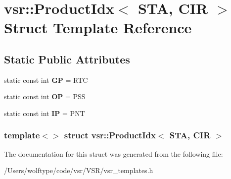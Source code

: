 \hypertarget{structvsr_1_1_product_idx_3_01_s_t_a_00_01_c_i_r_01_4}{\section{vsr\-:\-:Product\-Idx$<$ S\-T\-A, C\-I\-R $>$ Struct Template Reference}
\label{structvsr_1_1_product_idx_3_01_s_t_a_00_01_c_i_r_01_4}
}
\subsection*{Static Public Attributes}
\begin{DoxyCompactItemize}
\item 
\hypertarget{structvsr_1_1_product_idx_3_01_s_t_a_00_01_c_i_r_01_4_af9e39cc4b4360dd4be5a278cbf2e6987}{static const int {\bfseries G\-P} = R\-T\-C}\label{structvsr_1_1_product_idx_3_01_s_t_a_00_01_c_i_r_01_4_af9e39cc4b4360dd4be5a278cbf2e6987}

\item 
\hypertarget{structvsr_1_1_product_idx_3_01_s_t_a_00_01_c_i_r_01_4_ad2ddc709dca8c27cef5b4f06c0953cb5}{static const int {\bfseries O\-P} = P\-S\-S}\label{structvsr_1_1_product_idx_3_01_s_t_a_00_01_c_i_r_01_4_ad2ddc709dca8c27cef5b4f06c0953cb5}

\item 
\hypertarget{structvsr_1_1_product_idx_3_01_s_t_a_00_01_c_i_r_01_4_a27d83aacdeeebdde200489fcc71304d6}{static const int {\bfseries I\-P} = P\-N\-T}\label{structvsr_1_1_product_idx_3_01_s_t_a_00_01_c_i_r_01_4_a27d83aacdeeebdde200489fcc71304d6}

\end{DoxyCompactItemize}
\subsubsection*{template$<$$>$ struct vsr\-::\-Product\-Idx$<$ S\-T\-A, C\-I\-R $>$}



The documentation for this struct was generated from the following file\-:\begin{DoxyCompactItemize}
\item 
/\-Users/wolftype/code/vsr/\-V\-S\-R/vsr\-\_\-templates.\-h\end{DoxyCompactItemize}
